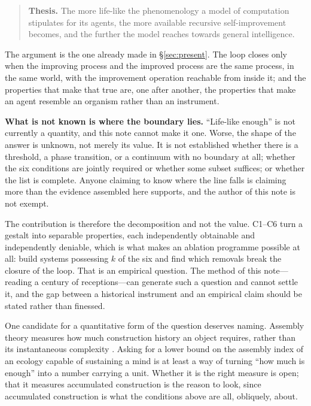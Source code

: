 \documentclass[11pt,a4paper]{article}
\begin{document}
\begin{quote}
\textbf{Thesis.} The more life-like the phenomenology a model of computation
stipulates for its agents, the more available recursive self-improvement becomes,
and the further the model reaches towards general intelligence.
\end{quote}

The argument is the one already made in \S\ref{sec:present}. The loop closes only
when the improving process and the improved process are the same process, in the
same world, with the improvement operation reachable from inside it; and the
properties that make that true are, one after another, the properties that make
an agent resemble an organism rather than an instrument.

\textbf{What is not known is where the boundary lies.} ``Life-like enough'' is
not currently a quantity, and this note cannot make it one. Worse, the shape of
the answer is unknown, not merely its value. It is not established whether there
is a threshold, a phase transition, or a continuum with no boundary at all;
whether the six conditions are jointly required or whether some subset suffices;
or whether the list is complete. Anyone claiming to know where the line falls is
claiming more than the evidence assembled here supports, and the author of this
note is not exempt.

The contribution is therefore the decomposition and not the value. C1--C6 turn a
gestalt into separable properties, each independently obtainable and
independently deniable, which is what makes an ablation programme possible at
all: build systems possessing $k$ of the six and find which removals break the
closure of the loop. That is an empirical question. The method of this
note---reading a century of receptions---can generate such a question and cannot
settle it, and the gap between a historical instrument and an empirical claim
should be stated rather than finessed.

One candidate for a quantitative form of the question deserves naming. Assembly
theory measures how much construction history an object requires, rather than
its instantaneous complexity \cite{sharma2023}. Asking for a lower bound on the
assembly index of an ecology capable of sustaining a mind is at least a way of
turning ``how much is enough'' into a number carrying a unit. Whether it is the
right measure is open; that it measures accumulated construction is the reason to
look, since accumulated construction is what the conditions above are all,
obliquely, about.
\end{document}
